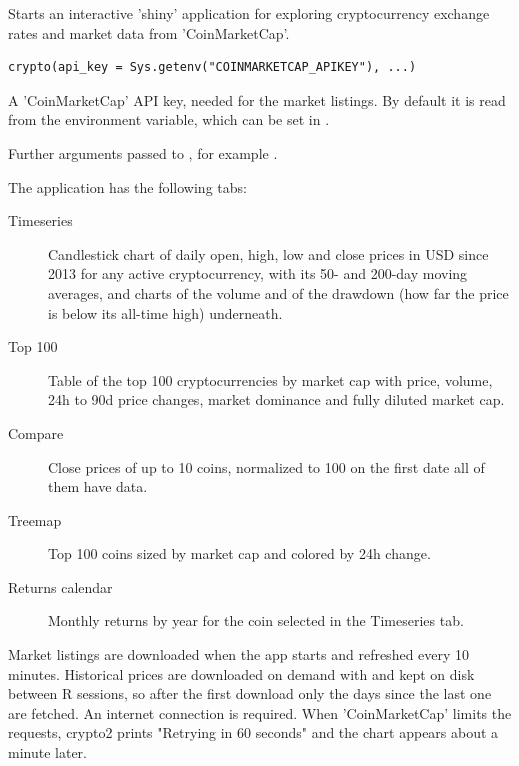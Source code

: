 \documentclass[a4paper]{book}
\begin{document}
%
\begin{Description}
Starts an interactive 'shiny' application for exploring
cryptocurrency exchange rates and market data from 'CoinMarketCap'.
\end{Description}
%
\begin{Usage}
\begin{verbatim}
crypto(api_key = Sys.getenv("COINMARKETCAP_APIKEY"), ...)
\end{verbatim}
\end{Usage}
%
\begin{Arguments}
\begin{ldescription}
\item[\code{api\_key}] A 'CoinMarketCap' API key, needed for the market listings.
By default it is read from the  environment
variable, which can be set in .

\item[\code{...}] Further arguments passed to , for example
.
\end{ldescription}
\end{Arguments}
%
\begin{Details}
The application has the following tabs:
\begin{description}

\item[Timeseries] Candlestick chart of daily open, high, low and close
prices in USD since 2013 for any active cryptocurrency, with its 50-
and 200-day moving averages, and charts of the volume and of the
drawdown (how far the price is below its all-time high) underneath.
\item[Top 100] Table of the top 100 cryptocurrencies by market cap with
price, volume, 24h to 90d price changes, market dominance and fully
diluted market cap.
\item[Compare] Close prices of up to 10 coins, normalized to 100 on the
first date all of them have data.
\item[Treemap] Top 100 coins sized by market cap and colored by 24h
change.
\item[Returns calendar] Monthly returns by year for the coin selected
in the Timeseries tab.

\end{description}

Market listings are downloaded when the app starts and refreshed every 10
minutes. Historical prices are downloaded on demand with
 and kept on disk between R sessions, so
after the first download only the days since the last one are fetched.
An internet connection is required. When 'CoinMarketCap' limits the requests,
crypto2 prints "Retrying in 60 seconds" and the chart appears about a
minute later.
\end{Details}
\end{document}
